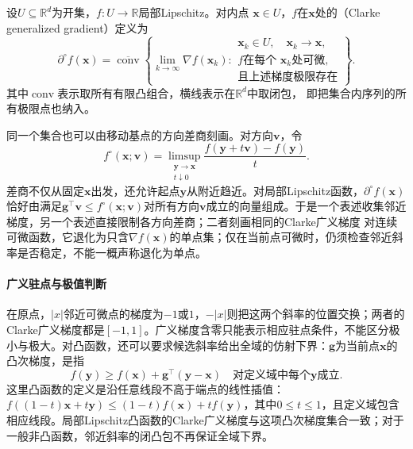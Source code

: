\begin{definition}[Clarke广义梯度]
\label{def:analysis-clarke-generalized-gradient}
设$U\subseteq\mathbb{R}^d$为开集，$f:U\to\mathbb{R}$局部Lipschitz。对内点
$\bm{x}\in U$，$f$在$\bm{x}$处的（Clarke generalized gradient）定义为
\[
  \partial^\circ f(\bm{x})
  =
  \overline{\operatorname{conv}}
  \left\{
    \lim_{k\to\infty}\nabla f(\bm{x}_k):
    \begin{array}{l}
      \bm{x}_k\in U,\quad\bm{x}_k\to\bm{x},\\
      f\text{在每个 }\bm{x}_k\text{处可微},\\
      \text{且上述梯度极限存在}
    \end{array}
  \right\}.
\]
其中$\operatorname{conv}$表示取所有有限凸组合，横线表示在$\mathbb{R}^d$中取闭包，
即把集合内序列的所有极限点也纳入。
\end{definition}


同一个集合也可以由移动基点的方向差商刻画。对方向$\bm v$，令
\[
 f^\circ(\bm x;\bm v)=\limsup_{\substack{\bm y\to\bm x\\t\downarrow0}}
 \frac{f(\bm y+t\bm v)-f(\bm y)}t.
\]
差商不仅从固定$\bm x$出发，还允许起点$\bm y$从附近趋近。对局部Lipschitz函数，$\partial^\circ f(\bm x)$恰好由满足$\bm g^\top\bm v\leq f^\circ(\bm x;\bm v)$对所有方向$\bm v$成立的向量组成。于是一个表述收集邻近梯度，另一个表述直接限制各方向差商；二者刻画相同的Clarke广义梯度
对连续可微函数，它退化为只含$\nabla f(\bm x)$的单点集；仅在当前点可微时，仍须检查邻近斜率是否稳定，不能一概声称退化为单点。

\paragraph{广义驻点与极值判断}

在原点，$|x|$邻近可微点的梯度为$-1$或$1$，$-|x|$则把这两个斜率的位置交换；两者的Clarke广义梯度都是$[-1,1]$。广义梯度含零只能表示相应驻点条件，不能区分极小与极大。对凸函数，还可以要求候选斜率给出全域的仿射下界：$\bm g$为当前点$\bm x$的凸次梯度，是指
\[
 f(\bm y)\geq f(\bm x)+\bm g^\top(\bm y-\bm x)
 \quad\text{对定义域中每个$\bm y$成立}.
\]
这里凸函数的定义是沿任意线段不高于端点的线性插值：$f((1-t)\bm x+t\bm y)\leq(1-t)f(\bm x)+tf(\bm y)$，其中$0\leq t\leq1$，且定义域包含相应线段。局部Lipschitz凸函数的Clarke广义梯度与这项凸次梯度集合一致；对于一般非凸函数，邻近斜率的闭凸包不再保证全域下界。


